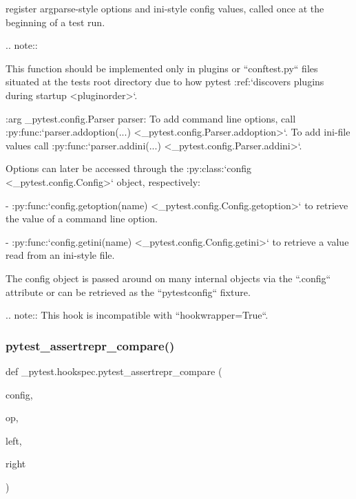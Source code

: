 \begin{DoxyVerb}register argparse-style options and ini-style config values,
called once at the beginning of a test run.

.. note::

    This function should be implemented only in plugins or ``conftest.py``
    files situated at the tests root directory due to how pytest
    :ref:`discovers plugins during startup <pluginorder>`.

:arg _pytest.config.Parser parser: To add command line options, call
    :py:func:`parser.addoption(...) <_pytest.config.Parser.addoption>`.
    To add ini-file values call :py:func:`parser.addini(...)
    <_pytest.config.Parser.addini>`.

Options can later be accessed through the
:py:class:`config <_pytest.config.Config>` object, respectively:

- :py:func:`config.getoption(name) <_pytest.config.Config.getoption>` to
  retrieve the value of a command line option.

- :py:func:`config.getini(name) <_pytest.config.Config.getini>` to retrieve
  a value read from an ini-style file.

The config object is passed around on many internal objects via the ``.config``
attribute or can be retrieved as the ``pytestconfig`` fixture.

.. note::
    This hook is incompatible with ``hookwrapper=True``.
\end{DoxyVerb}
 \mbox{\label{namespace__pytest_1_1hookspec_a447d47cdf30370db1a54107f2979ccba}} 
\subsubsection{\texorpdfstring{pytest\+\_\+assertrepr\+\_\+compare()}{pytest\_assertrepr\_compare()}}
{\footnotesize\ttfamily def \+\_\+pytest.\+hookspec.\+pytest\+\_\+assertrepr\+\_\+compare (\begin{DoxyParamCaption}\item[{}]{config,  }\item[{}]{op,  }\item[{}]{left,  }\item[{}]{right }\end{DoxyParamCaption})}


